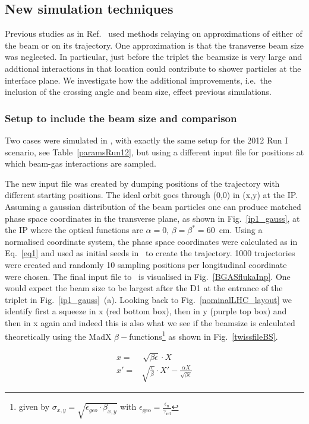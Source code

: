 \subsection{New simulation techniques}
Previous studies as in Ref.~\cite{nimPaperRod} used methods relaying on approximations of either of the beam or on its trajectory. One approximation is that the transverse beam size was neglected. In particular, just before the triplet the beamsize is very large and addtional interactions in that location could contribute to shower particles at the interface plane. We investigate how the additional improvements, i.e.~the inclusion of the crossing angle and beam size, effect previous simulations. 

\subsubsection{Setup to include the beam size and comparison \label{beamgasBS}}
Two cases were simulated in \fluka, with exactly the same setup for the 2012 Run I scenario, see Table~\ref{paramsRun12}, but using a different input file for positions at which beam-gas interactions are sampled.

The new input file was created by dumping positions of the trajectory with different starting positions. The ideal orbit goes through (0,0) in (x,y) at the IP. Assuming a gaussian distribution of the beam particles one can produce matched phase space coordinates in the transverse plane, as shown in Fig.~\ref{ip1_gauss}, at the IP where the optical functions are $\alpha = 0$, $\beta = \beta^* = 60$~cm. Using a normalised coordinate system, the phase space coordinates were calculated as in Eq.~\ref{eq1} and used as initial seeds in \fluka~to create the trajectory. 1000 trajectories were created and randomly 10 sampling positions per longitudinal coordinate were chosen. The final input file to \fluka~is visualised in Fig.~\ref{BGASflukaInp}. One would expect the beam size to be largest after the D1 at the entrance of the triplet in Fig.~\ref{ip1_gauss}~(a). Looking back to Fig.~\ref{nominalLHC_layout} we identify first a squeeze in x (red bottom box), then in y (purple top box) and then in x again and indeed this is also what we see if the beamsize is calculated theoretically using the MadX $\beta-$functions\footnote{given by $\sigma_{x,y} = \sqrt{\epsilon_{geo} \cdot \beta_{x,y}}$ with $\epsilon_{\textrm{geo}} = \frac{ \epsilon_{\textrm{n}}}{\gamma_{\textrm{rel}}}$} as shown in Fig.~\ref{twissfileBS}.

\begin{equation} \label{eq1}
  \begin{split}
x = & \, \sqrt{\beta \epsilon} \cdot X \\
x' = & \sqrt{\frac{\epsilon}{\beta}} \cdot X' - \frac{\alpha X}{\sqrt{\beta \epsilon}}
  \end{split}
\end{equation}

